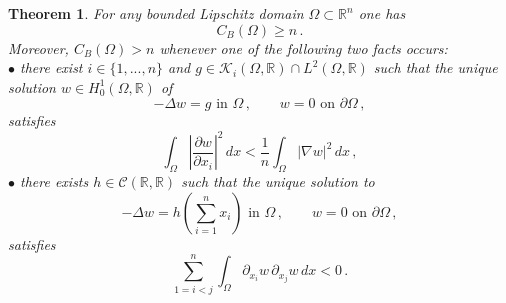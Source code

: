 \documentclass[11pt]{article}
\newtheorem{theorem}{Theorem}[section]
\theoremstyle{plain}
\theoremstyle{definition}
\numberwithin{equation}{section}
\newcommand{\R}{\mathbb{R}}
\begin{document}
\begin{theorem}\label{lowerbound}
	For any bounded Lipschitz domain $\Omega\subset\R^n$ one has
	$$
	C_B(\Omega)\ge n \, .
	$$
Moreover, $C_B(\Omega)>n$ whenever one of the following two facts occurs:\\
$\bullet$ there exist $i \in \{1,...,n\}$ and $g\in\mathcal{K}_{i}(\Omega, \mathbb{R}) \cap L^{2}(\Omega, \mathbb{R})$ such that the unique solution $w \in H^{1}_{0}(\Omega, \mathbb{R})$ of
\begin{equation}\label{generalTorsion}
- \Delta w = g\mbox{ in }\Omega\, , \qquad w = 0\mbox{ on }\partial \Omega  \, ,
	\end{equation}
	satisfies
	\begin{equation}\label{condition}
	\int_\Omega \left| \dfrac{\partial w}{\partial x_{i}} \right|^2 \, dx<\frac{1}{n}\int_\Omega|\nabla w|^2\, dx\, ,
	\end{equation}
$\bullet$ there exists $h\in \mathcal{C}(\R, \mathbb{R})$ such that the unique solution to
\begin{equation}\label{hsum}
-\Delta w=h\left(\sum_{i=1}^nx_i\right)\mbox{ in }\Omega\, ,\qquad w=0\mbox{ on }\partial\Omega\, ,
\end{equation}
satisfies
\begin{equation}\label{negativepd}
\sum_{1=i<j}^{n}\int_\Omega\partial_{x_i}w\, \partial_{x_j}w\, dx<0\, .
\end{equation}
\end{theorem}
\end{document}
